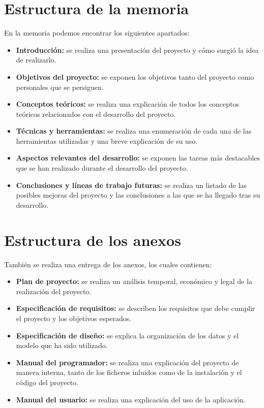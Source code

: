 \section{Estructura de la memoria}
En la memoria podemos encontrar los siguientes apartados:
\begin{itemize}
    \item \textbf{Introducción:} se realiza una presentación del proyecto y cómo surgió la idea de realizarlo.
    \item \textbf{Objetivos del proyecto:} se exponen los objetivos tanto del proyecto como personales que se persiguen.
    \item \textbf{Conceptos teóricos:} se realiza una explicación de todos los conceptos teóricos relacionados con el desarrollo del proyecto.
    \item \textbf{Técnicas y herramientas:} se realiza una enumeración de cada una de las herramientas utilizadas y una breve explicación de su uso.
    \item \textbf{Aspectos relevantes del desarrollo:} se exponen las tareas más destacables que se han realizado durante el desarrollo del proyecto.
    \item \textbf{Conclusiones y líneas de trabajo futuras:} se realiza un listado de las posibles mejoras del proyecto y las conclusiones a las que se ha llegado tras su desarrollo.
\end{itemize}
\section{Estructura de los anexos}
También se realiza una entrega de los anexos, los cuales contienen:
\begin{itemize}
    \item \textbf{Plan de proyecto:} se realiza un análisis temporal, económico y legal de la realización del proyecto.
    \item \textbf{Especificación de requisitos:} se describen los requisitos que debe cumplir el proyecto y los objetivos esperados.
    \item \textbf{Especificación de diseño:} se explica la organización de los datos y el modelo que ha sido utilizado.
    \item \textbf{Manual del programador:} se realiza una explicación del proyecto de manera interna, tanto de los ficheros inluidos como de la instalación y el código del proyecto.
    \item \textbf{Manual del usuario:} se realiza una explicación del uso de la aplicación.
\end{itemize}
